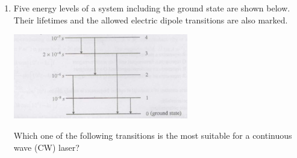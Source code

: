 \documentclass[14pt, a4paper]{extarticle}
\begin{document}
\begin{enumerate}[label=\textbf{Q. \arabic*}, start=21]
\begin{enumerate}[label=(\Alph*)]
    \end{enumerate}

\item Five energy levels of a system including the ground state are shown below. Their lifetimes and the allowed electric dipole transitions are also marked.
    \begin{center}
        \includegraphics[width=0.6\textwidth]{figs/Q31fig.png}
    \end{center}
    Which one of the following transitions is the most suitable for a continuous wave (CW) laser?
    \begin{enumerate}[label=(\Alph*)]
    \end{enumerate}


\end{enumerate}
\end{document}
